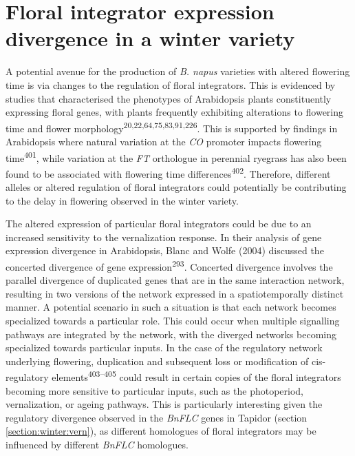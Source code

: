 \documentclass[12pt,]{book}
\begin{document}
\section{Floral integrator expression divergence in a winter
variety}\label{section:winter:floralintegrators}

A potential avenue for the production of \emph{B. napus} varieties with
altered flowering time is via changes to the regulation of floral
integrators. This is evidenced by studies that characterised the
phenotypes of Arabidopsis plants constituently expressing floral genes,
with plants frequently exhibiting alterations to flowering time and
flower morphology\textsuperscript{20,22,64,75,83,91,226}. This is
supported by findings in Arabidopsis where natural variation at the
\emph{CO} promoter impacts flowering time\textsuperscript{401}, while
variation at the \emph{FT} orthologue in perennial ryegrass has also
been found to be associated with flowering time
differences\textsuperscript{402}. Therefore, different alleles or
altered regulation of floral integrators could potentially be
contributing to the delay in flowering observed in the winter variety.

The altered expression of particular floral integrators could be due to
an increased sensitivity to the vernalization response. In their
analysis of gene expression divergence in Arabidopsis, Blanc and Wolfe
(2004) discussed the concerted divergence of gene
expression\textsuperscript{293}. Concerted divergence involves the
parallel divergence of duplicated genes that are in the same interaction
network, resulting in two versions of the network expressed in a
spatiotemporally distinct manner. A potential scenario in such a
situation is that each network becomes specialized towards a particular
role. This could occur when multiple signalling pathways are integrated
by the network, with the diverged networks becoming specialized towards
particular inputs. In the case of the regulatory network underlying
flowering, duplication and subsequent loss or modification of
cis-regulatory elements\textsuperscript{403--405} could result in
certain copies of the floral integrators becoming more sensitive to
particular inputs, such as the photoperiod, vernalization, or ageing
pathways. This is particularly interesting given the regulatory
divergence observed in the \emph{BnFLC} genes in Tapidor (section
\ref{section:winter:vern}), as different homologues of floral
integrators may be influenced by different \emph{BnFLC} homologues.
\end{document}
